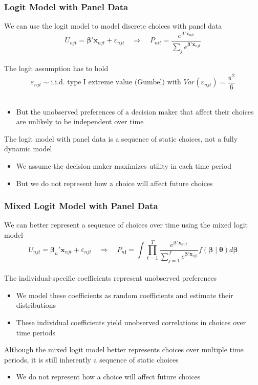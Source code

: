 \documentclass{beamer}
\begin{document}
\begin{frame}\frametitle{Logit Model with Panel Data}
    We can use the logit model to model discrete choices with panel data
    $$U_{njt} = \bm{\beta}' \bm{x}_{njt} + \varepsilon_{njt} \quad \Rightarrow \quad P_{nit} = \frac{e^{\bm{\beta}' \bm{x}_{nit}}}{\sum_j e^{\bm{\beta}' \bm{x}_{njt}}}$$ \\
    \vspace{2ex}
    The logit assumption has to hold
    $$\varepsilon_{njt} \sim \text{i.i.d.\ type I extreme value (Gumbel) with } Var(\varepsilon_{njt}) = \frac{\pi^2}{6}$$ \\
    \begin{itemize}
        \item But the unobserved preferences of a decision maker that affect their choices are unlikely to be independent over time
    \end{itemize}
    \vspace{2ex}
    The logit model with panel data is a sequence of static choices, not a fully dynamic model
    \begin{itemize}
        \item We assume the decision maker maximizes utility in each time period
        \item But we do not represent how a choice will affect future choices
    \end{itemize}
\end{frame}

\begin{frame}\frametitle{Mixed Logit Model with Panel Data}
    We can better represent a sequence of choices over time using the mixed logit model
    $$U_{njt} = \bm{\beta}_n' \bm{x}_{njt} + \varepsilon_{njt} \quad \Rightarrow \quad P_{n\bm{i}} = \int \prod_{t = 1}^T \frac{e^{\bm{\beta}' \bm{x}_{ni_{t}t}}}{\sum_{j = 1}^J e^{\bm{\beta}' \bm{x}_{njt}}} f(\bm{\beta} \mid \bm{\theta}) d \bm{\beta}$$ \\
    \vspace{2ex}
    The individual-specific coefficients represent unobserved preferences
    \begin{itemize}
        \item We model these coefficients as random coefficients and estimate their distributions
        \item These individual coefficients yield unobserved correlations in choices over time periods
    \end{itemize}
    \vspace{2ex}
    Although the mixed logit model better represents choices over multiple time periods, it is still inherently a sequence of static choices
    \begin{itemize}
    	\item We do not represent how a choice will affect future choices
    \end{itemize}
\end{frame}
\end{document}
